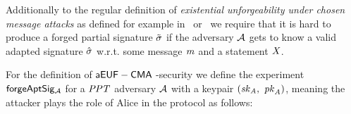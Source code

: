 Additionally to the regular definition of \emph{existential unforgeability under chosen message attacks} as defined for example in~\cite{lindell2017fast} or~\cite{vaudenay2006classical} we require that it is hard to produce a forged partial signature $\tilde{\sigma}$ if the
adversary $\mathcal{A}$ gets to know a valid adapted signature $\hat{\sigma}$ w.r.t. some message $\mathit{m}$ and a statement $\mathit{X}$.
\begin{definition}[$\cnstaEUFCMA$] \label{def:sig:aeuf-cma}

    For the definition of $\cnstaEUFCMA$-security we define the experiment $\mathsf{forgeAptSig_{\mathcal{A}}}$ for a $\mathit{PPT}$ adversary $\mathcal{A}$ with a keypair $(\mathit{sk}_{\mathit{A}} ,~ \mathit{pk}_{\mathit{A}})$,
    meaning the attacker plays the role of Alice in the protocol as
    follows:


\end{definition}
